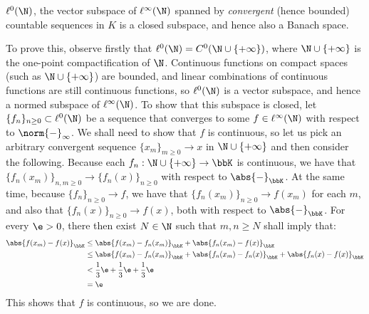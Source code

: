         \begin{example} \label{example: convergent_sequences}
            $\ell^0(\N)$, the vector subspace of $\ell^{\infty}(\N)$ spanned by \textit{convergent} (hence bounded) countable sequences in $K$ is a closed subspace, and hence also a Banach space.
        
            To prove this, observe firstly that $\ell^0(\N) = C^0(\N \cup \{+\infty\})$, where $\N \cup \{+\infty\}$ is the one-point compactification of $\N$. Continuous functions on compact spaces (such as $\N \cup \{+\infty\}$) are bounded, and linear combinations of continuous functions are still continuous functions, so $\ell^0(\N)$ is a vector subspace, and hence a normed subspace of $\ell^{\infty}(\N)$. To show that this subspace is closed, let $\{f_n\}_{n \geq 0} \subset \ell^0(\N)$ be a sequence that converges to some $f \in \ell^{\infty}(\N)$ with respect to $\norm{-}_{\infty}$. We shall need to show that $f$ is continuous, so let us pick an arbitrary convergent sequence $\{x_m\}_{m \geq 0} \to x$ in $\N \cup \{+\infty\}$ and then consider the following. Because each $f_n: \N \cup \{+\infty\} \to \bbK$ is continuous, we have that $\{f_n(x_m)\}_{n, m \geq 0} \to \{f_n(x)\}_{n \geq 0}$ with respect to $\abs{-}_{\bbK}$. At the same time, because $\{f_n\}_{n \geq 0} \to f$, we have that $\{f_n(x_m)\}_{n \geq 0} \to f(x_m)$ for each $m$, and also that $\{f_n(x)\}_{n \geq 0} \to f(x)$, both with respect to $\abs{-}_{\bbK}$. For every $\e > 0$, there then exist $N \in \N$ such that $m, n \geq N$ shall imply that:
                $$
                    \begin{aligned}
                        \abs{f(x_m) - f(x)}_{\bbK} & \leq \abs{ f(x_m) - f_n(x_m) }_{\bbK} + \abs{f_n(x_m) - f(x)}_{\bbK}
                        \\
                        & \leq \abs{ f(x_m) - f_n(x_m) }_{\bbK} + \abs{f_n(x_m) - f_n(x)}_{\bbK} + \abs{f_n(x) - f(x)}_{\bbK}
                        \\
                        & < \frac13 \e + \frac13 \e + \frac13 \e
                        \\
                        & = \e
                    \end{aligned}
                $$
            This shows that $f$ is continuous, so we are done.
        \end{example}
        \begin{example} \label{example: sequences_converging_to_zero}
            
        \end{example}
        \begin{example} \label{example: eventually_zero_sequences}
            
        \end{example}

